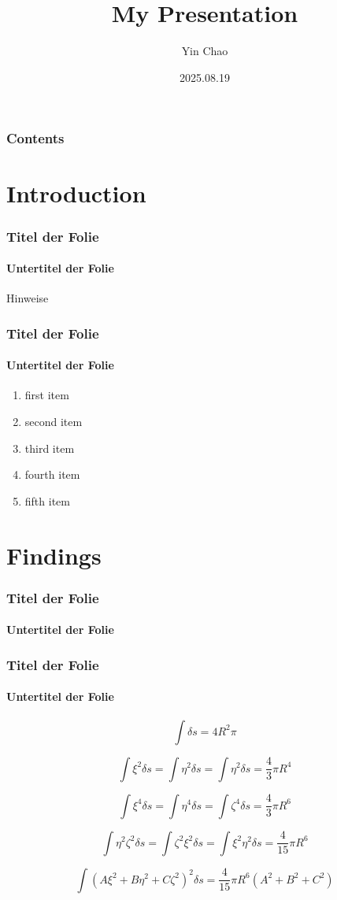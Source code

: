 \documentclass{beamer}
\title{My Presentation}
\author{Yin Chao}
\date{2025.08.19}
\institute{UCAS $\times$ BGI Genomics}
\begin{document}
\begin{frame}

\titlepage

\end{frame}

\begin{frame}
\frametitle{Contents}

\tableofcontents

\end{frame}

\section{Introduction}

\begin{frame}
\frametitle{Titel der Folie}
\framesubtitle{Untertitel der Folie}

\begin{alert}{Hinweise}
{\scriptsize \blindtext}
\end{alert}


\end{frame}


\begin{frame}
\frametitle{Titel der Folie}
\framesubtitle{Untertitel der Folie}

\begin{enumerate}
\item first item
\item second item
\item third item
\item fourth item
\item fifth item
\end{enumerate}


\end{frame}

\section{Findings}

\begin{frame}
\frametitle{Titel der Folie}
\framesubtitle{Untertitel der Folie}

\blindtext


\end{frame}

\begin{frame}
\frametitle{Titel der Folie}
\framesubtitle{Untertitel der Folie}


\[ \int \delta s = 4 R^2 \pi \]

\[\int \xi^2 \delta s = \int \eta^2 \delta s = \int \eta^2 \delta s = \frac{4}{3} \pi R^4 \]

\[\int \xi^4 \delta s = \int \eta^4 \delta s = \int \zeta^4 \delta s = \frac{4}{3} \pi R^6 \]

\[\int \eta^2 \zeta^2 \delta s = \int \zeta^2 \xi^2 \delta s = \int \xi^2 \eta^2 \delta s = \frac{4}{15} \pi R^6 \]

\[\int \left( A \xi^2 + B \eta^2+ C \zeta^2 \right)^2 \delta s = \frac{4}{15} \pi R^6 \left( A^2 + B^2 + C^2 \right)\]

\end{frame}
\end{document}
